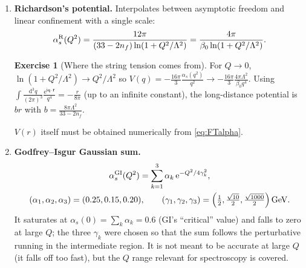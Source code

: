 \documentclass[11pt,a4paper]{article}
\numberwithin{equation}{section}
\theoremstyle{definition}
\newtheorem{exercise}[definition]{Exercise}
\theoremstyle{plain}
\theoremstyle{remark}
\numberwithin{algorithm}{section}
\newcommand{\vr}{\bm r}
\newcommand{\vq}{\bm q}
\newcommand{\as}{\alpha_s}
\newcommand{\dd}{\mathrm{d}}
\newcommand{\ii}{\mathrm{i}}
\newcommand{\ee}{\mathrm{e}}
\newcommand{\GeV}{\,\mathrm{GeV}}
\begin{document}
\begin{enumerate}[leftmargin=1.5em,itemsep=4pt]
\item \textbf{Richardson's potential.} Interpolates between asymptotic freedom and linear confinement with a single scale:
\begin{equation}
\as^{\rm R}(Q^2)=\frac{12\pi}{(33-2n_f)\ln(1+Q^2/\Lambda^2)}=\frac{4\pi}{\beta_0\ln(1+Q^2/\Lambda^2)} .
\end{equation}
\begin{exercise}[Where the string tension comes from]
For $Q\to0$, $\ln(1+Q^2/\Lambda^2)\to Q^2/\Lambda^2$ so $V(q)=-\frac{16\pi}{3}\frac{\as(q^2)}{q^2}\to-\frac{16\pi}{3}\frac{4\pi\Lambda^2}{\beta_0q^4}$. Using $\int\frac{\dd^3q}{(2\pi)^3}\frac{\ee^{\ii\vq\cdot\vr}}{q^4}=-\frac{r}{8\pi}$ (up to an infinite constant), the long-distance potential is $br$ with $b=\frac{8\pi\Lambda^2}{33-2n_f}$.
\end{exercise}
$V(r)$ itself must be obtained numerically from \eqref{eq:FTalpha}.

\item \textbf{Godfrey--Isgur Gaussian sum.}
\begin{equation}
\begin{gathered}
\as^{\rm GI}(Q^2)=\sum_{k=1}^3\alpha_k\,\ee^{-Q^2/4\gamma_k^2},\\
(\alpha_1,\alpha_2,\alpha_3)=(0.25,0.15,0.20),\qquad (\gamma_1,\gamma_2,\gamma_3)=\Big(\tfrac12,\tfrac{\sqrt{10}}{2},\tfrac{\sqrt{1000}}{2}\Big)\GeV .
\end{gathered}
\label{eq:aGI}
\end{equation}
It saturates at $\as(0)=\sum_k\alpha_k=0.6$ (GI's ``critical'' value) and falls to zero at large $Q$; the three $\gamma_k$ were chosen so that the sum follows the perturbative running in the intermediate region. It is not meant to be accurate at large $Q$ (it falls off too fast), but the $Q$ range relevant for spectroscopy is covered.
\end{enumerate}
\end{document}
